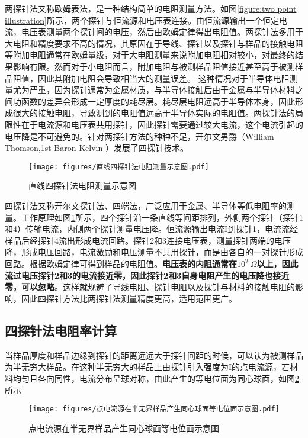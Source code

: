 \documentclass[12pt]{ctexart}
\begin{document}
两探针法又称欧姆表法，是一种结构简单的电阻测量方法。如图\ref{figure:two point illustration}所示，两个探针与恒流源和电压表连接。由恒流源输出一个恒定电流，电压表测量两个探针间的电压，然后由欧姆定律得出电阻值。两探针法多用于大电阻和精度要求不高的情况，其原因在于导线、探针以及探针与样品的接触电阻等附加电阻通常在欧姆量级，对于大电阻测量来说附加电阻相对较小，对最终的结果影响有限。然而对于小电阻而言，附加电阻与被测样品阻值接近甚至高于被测样品阻值，因此其附加电阻会导致相当大的测量误差。
这种情况对于半导体电阻测量尤为严重，因为探针通常为金属材质，与半导体接触后由于金属与半导体材料之间功函数的差异会形成一定厚度的耗尽层。耗尽层电阻远高于半导体本身，因此形成很大的接触电阻，导致测到的电阻值远高于半导体实际的电阻值。两探针法的局限性在于电流源和电压表共用探针，因此探针需要通过较大电流，这个电流引起的电压降是不可避免的。针对两探针方法的种种不足，开尔文男爵（William Thomson,1st Baron Kelvin ）发展了四探针技术。

\begin{figure}[H]
	\centering
	\texttt{[image: figures/直线四探针法电阻测量示意图.pdf]}
	\caption{直线四探针法电阻测量示意图\label{figure:aligned four point illustration}}
\end{figure}

四探针法又称开尔文探针法、四端法，广泛应用于金属、半导体等低电阻率的测量。工作原理如图\ref{figure:aligned four point illustration}所示，四个探针沿一条直线等间距排列，外侧两个探针（探针1和4）传输电流，内侧两个探针测量电压降。恒流源输出电流I到探针1，电流流经样品后经探针4流出形成电流回路。探针2和3连接电压表，测量探针两端的电压降，形成电压回路，电流激励和电压测量不共用探针，而是由各自的一对探针形成回路。根据欧姆定律可得到样品的电阻值。{\bf 电压表的内阻通常在$10^9\ \Omega$以上，因此流过电压探针2和3的电流接近零，因此探针2和3自身电阻产生的电压降也接近零，可以忽略}。这样就规避了导线电阻、探针电阻以及探针与材料的接触电阻的影响，因此四探针方法比两探针法测量精度更高，适用范围更广。

\subsection{四探针法电阻率计算}
当样品厚度和样品边缘到探针的距离远远大于探针间距的时候，可以认为被测样品为半无穷大样品。在这种半无穷大的样品上由探针引入强度为I的点电流源，若材料均匀且各向同性，电流分布呈球对称，由此产生的等电位面为同心球面，如图\ref{figure:point current source illustration}所示

\begin{figure}[H]
	\centering
	\texttt{[image: figures/点电流源在半无界样品产生同心球面等电位面示意图.pdf]}
	\caption{点电流源在半无界样品产生同心球面等电位面示意图\label{figure:point current source illustration}}
\end{figure}
\end{document}
